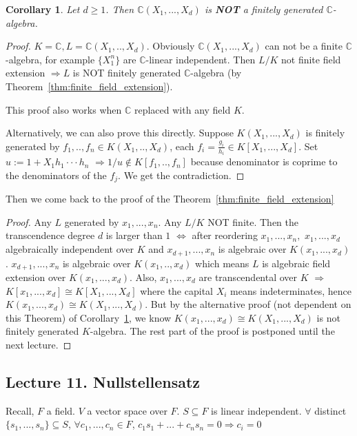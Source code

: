 \documentclass[11pt]{article}
\newtheorem{cor}[thm]{Corollary}
\newcommand{\cplx}{\mathbb C}
\newcommand{\Lrta}{\Longrightarrow}
\newcommand{\Llrta}{\Longleftrightarrow}
\begin{document}
\begin{cor}\label{cor:rational_functions_not_fin.gen.alg}
Let $d\geq 1$. Then $\cplx(X_1,...,X_d)$ is \textbf{NOT} a finitely generated $\cplx$-algebra.
\end{cor}
\begin{proof}
$K=\cplx,  L=\cplx(X_1,..,X_d)$. Obviously $\cplx(X_1,...,X_d)$ can not be a finite $\cplx$-algebra, for example $\{X_1^n\}$ are $\cplx$-linear independent. Then $ L/K$ not finite field extension $\Lrta  L$ is NOT finitely generated $\cplx$-algebra (by Theorem~\ref{thm:finite_field_extension}).

This proof also works when $\cplx$ replaced with any field $K$.

Alternatively, we can also prove this directly. Suppose $K(X_1,...,X_d)$ is finitely generated by $f_1,..,f_n\in K(X_1,..,X_d)$, each $f_i=\frac{g_i}{h_i}\in K[X_1,...,X_d]$. Set $u:=1+X_1 h_1\cdot\cdot\cdot h_n$
$\Lrta 1/u\notin K[f_1,..,f_n]$ because denominator is coprime to the denominators of the $f_j$. We get the contradiction.
\end{proof}

Then we come back to the proof of the Theorem~\ref{thm:finite_field_extension}
\begin{proof}
Any $ L$ generated by $x_1,...,x_n$. Any $ L/K$ NOT finite. Then the  transcendence degree $d$ is larger than $1$
$\Llrta$ after reordering $x_1,...,x_n,$ $x_1,...,x_d$ algebraically independent over $K$ and $x_{d+1},...,x_n$ is algebraic over $K(x_1,...,x_d)$. $x_{d+1},...,x_n$ is algebraic over $K(x_1,..,x_d)$ which means $ L$ is algebraic field extension over $K(x_1,...,x_d)$. Also, $x_1,...,x_d$ are transcendental over $K$ $\Lrta$ $K[x_1,...,x_d]\cong K[X_1,...,X_d]$ where the capital $X_i$ means indeterminates, hence $K(x_1,...,x_d)\cong K(X_1,...,X_d)$. But by the alternative proof (not dependent on this Theorem) of Corollary~\ref{cor:rational_functions_not_fin.gen.alg}, we know  $K(x_1,...,x_d)\cong K(X_1,...,X_d)$ is not finitely generated $K$-algebra. The rest part of the proof is postponed until the next lecture.
\end{proof}

\subsection{Lecture 11. Nullstellensatz}

Recall, $F$ a field. $V$ a vector space over $F$. $S\subseteq F$ is linear independent. $\forall $ distinct $\{s_1,...,s_n\}\subseteq S$, $\forall c_1,...,c_n\in F$, $c_1 s_1+...+c_n s_n=0\Lrta c_i=0$
\end{document}
